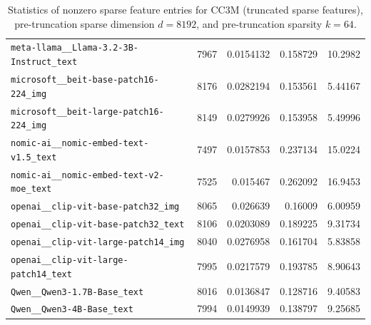 \begin{table}[htbp]
{\begin{tabular}{lrrrr}
\texttt{meta-llama\_\_Llama-3.2-3B-Instruct\_text} & 7967 & 0.0154132 & 0.158729 & 10.2982 \\
\texttt{microsoft\_\_beit-base-patch16-224\_img} & 8176 & 0.0282194 & 0.153561 & 5.44167 \\
\texttt{microsoft\_\_beit-large-patch16-224\_img} & 8149 & 0.0279926 & 0.153958 & 5.49996 \\
\texttt{nomic-ai\_\_nomic-embed-text-v1.5\_text} & 7497 & 0.0157853 & 0.237134 & 15.0224 \\
\texttt{nomic-ai\_\_nomic-embed-text-v2-moe\_text} & 7525 & 0.015467 & 0.262092 & 16.9453 \\
\texttt{openai\_\_clip-vit-base-patch32\_img} & 8065 & 0.026639 & 0.16009 & 6.00959 \\
\texttt{openai\_\_clip-vit-base-patch32\_text} & 8106 & 0.0203089 & 0.189225 & 9.31734 \\
\texttt{openai\_\_clip-vit-large-patch14\_img} & 8040 & 0.0276958 & 0.161704 & 5.83858 \\
\texttt{openai\_\_clip-vit-large-patch14\_text} & 7995 & 0.0217579 & 0.193785 & 8.90643 \\
\texttt{Qwen\_\_Qwen3-1.7B-Base\_text} & 8016 & 0.0136847 & 0.128716 & 9.40583 \\
\texttt{Qwen\_\_Qwen3-4B-Base\_text} & 7994 & 0.0149939 & 0.138797 & 9.25685 \\
\bottomrule
\end{tabular}
}%
\caption{Statistics of nonzero sparse feature entries for CC3M (truncated sparse features), pre-truncation sparse dimension $d=8192$, and pre-truncation sparsity $k=64$.}
\label{tab:sparse-feature-entries-cc3m-truncated-d8192-k64}
\end{table}
